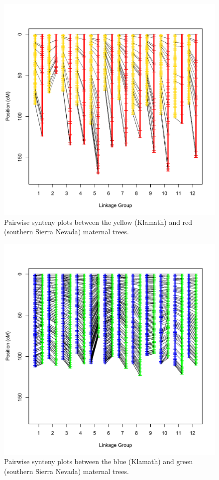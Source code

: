 \documentclass[smallextended]{svjour3}
\begin{document}
\begin{figure}[ht]
  \centering
  \includegraphics[width=\textwidth]{yellow_red_synteny}
  \caption{Pairwise synteny plots between the yellow (Klamath) and red (southern Sierra Nevada) maternal trees.}
  \label{f:con}
\end{figure}

\begin{figure}[ht]
  \centering
  \includegraphics[width=\textwidth]{blue_green_synteny}
  \caption{Pairwise synteny plots between the blue (Klamath) and green (southern Sierra Nevada) maternal trees.}
\end{figure}
\end{document}
